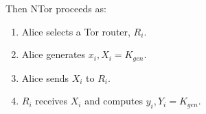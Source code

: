 Then NTor proceeds as:

\begin{enumerate} %
	\item \label{item:First2}
		Alice selects a Tor router, $ R_{i} $.
	\item
		Alice generates $ x_{i}, X_{i} = K_{\mathit{gen}} $.
	\item
		Alice sends $ X_{i} $ to $ R_{i} $.
	\item
		$ R_{i} $ receives $ X_{i} $ and computes $ y_{i}, Y_{i} = K_{\mathit{gen}} $.
	
\end{enumerate}



%




